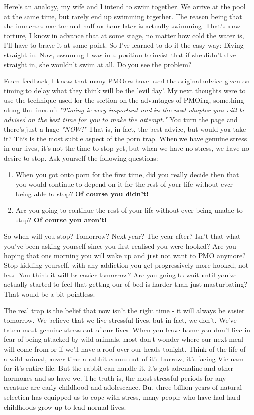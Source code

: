 \documentclass[easypeasy.tex]{subfiles}
\begin{document}
Here's an analogy, my wife and I intend to swim together. We arrive at the pool at the same time, but rarely end up swimming together. The reason being that she immerses one toe and half an hour later is actually swimming. That's slow torture, I know in advance that at some stage, no matter how cold the water is, I'll have to brave it at some point. So I've learned to do it the easy way: Diving straight in. Now, assuming I was in a position to insist that if she didn't dive straight in, she wouldn't swim at all. Do you see the problem?

From feedback, I know that many PMOers have used the original advice given on timing to delay what they think will be the 'evil day'. My next thoughts were to use the technique used for the section on the advantages of PMOing, something along the lines of: \textit{"Timing is very important and in the next chapter you will be advised on the best time for you to make the attempt."} You turn the page and there's just a huge \textit{"NOW!"} That is, in fact, the best advice, but would you take it? This is the most subtle aspect of the porn trap. When we have genuine stress in our lives, it's not the time to stop yet, but when we have no stress, we have no desire to stop. Ask yourself the following questions:

\begin{enumerate}
  \item When you got onto porn for the first time, did you really decide then that you would continue to depend on it for the rest of your life without ever being able to stop? \textbf{Of course you didn't!}

  \item Are you going to continue the rest of your life without ever being unable to stop? \textbf{Of course you aren't!}
  \end{enumerate}

So when will you stop? Tomorrow? Next year? The year after? Isn't that what you've been asking yourself since you first realised you were hooked? Are you hoping that one morning you will wake up and just not want to PMO anymore? Stop kidding yourself, with any addiction you get progressively more hooked, not less. You think it will be easier tomorrow? Are you going to wait until you've actually started to feel that getting our of bed is harder than just masturbating? That would be a bit pointless.

The real trap is the belief that now isn't the right time - it will always be easier tomorrow. We believe that we live stressful lives, but in fact, we don't. We've taken most genuine stress out of our lives. When you leave home you don't live in fear of being attacked by wild animals, most don't wonder where our next meal will come from or if we'll have a roof over our heads tonight. Think of the life of a wild animal, never time a rabbit comes out of it's burrow, it's facing Vietnam for it's entire life. But the rabbit can handle it, it's got adrenaline and other hormones and so have we. The truth is, the most stressful periods for any creature are early childhood and adolescence. But three billion years of natural selection has equipped us to cope with stress, many people who have had hard childhoods grow up to lead normal lives.
\end{document}
